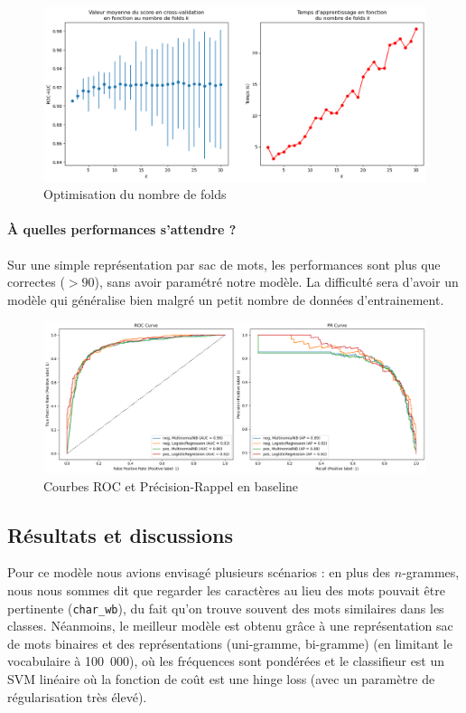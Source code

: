 \documentclass{article}
\begin{document}
\begin{figure}[H]
    \centering
    \includegraphics[width=\textwidth]{./src/movies/crossval_analysis.png} 
    \caption{Optimisation du nombre de folds}
    \label{crossval_analysis_movies}
\end{figure}

\paragraph{À quelles performances s'attendre ?} Sur une simple représentation par sac de mots, les performances sont plus que correctes ($> 90$), sans avoir paramétré notre modèle. La difficulté sera d'avoir un modèle qui généralise bien malgré un petit nombre de données d'entrainement.

\begin{figure}[H]
    \centering
    \includegraphics[width=\textwidth]{./src/movies/roc_curve.png} 
    \caption{Courbes ROC et Précision-Rappel en baseline}
    \label{roc_curve_movies}
\end{figure}

\subsection{Résultats et discussions}

Pour ce modèle nous avions envisagé plusieurs scénarios : en plus des $n$-grammes, nous nous sommes dit que regarder les caractères au lieu des mots pouvait être pertinente (\texttt{char\_wb}), du fait qu'on trouve souvent des mots similaires dans les classes. Néanmoins, le meilleur modèle est obtenu grâce à une représentation sac de mots binaires et des représentations (uni-gramme, bi-gramme) (en limitant le vocabulaire à 100~000), où les fréquences sont pondérées et le classifieur est un SVM linéaire où la fonction de coût est une hinge loss (avec un paramètre de régularisation très élevé). 
\end{document}
